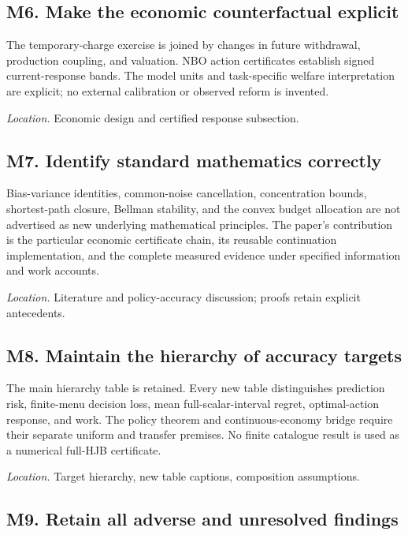 \documentclass[ecta,nameyear,draft]{econsocart}
\theoremstyle{definition}
\theoremstyle{remark}
\begin{document}
\subsection*{M6. Make the economic counterfactual explicit}

The temporary-charge exercise is joined by changes in future withdrawal, production coupling, and valuation. NBO action certificates establish signed current-response bands. The model units and task-specific welfare interpretation are explicit; no external calibration or observed reform is invented.


\par\smallskip\noindent\emph{Location.} Economic design and certified response subsection.

\subsection*{M7. Identify standard mathematics correctly}

Bias-variance identities, common-noise cancellation, concentration bounds, shortest-path closure, Bellman stability, and the convex budget allocation are not advertised as new underlying mathematical principles. The paper's contribution is the particular economic certificate chain, its reusable continuation implementation, and the complete measured evidence under specified information and work accounts.


\par\smallskip\noindent\emph{Location.} Literature and policy-accuracy discussion; proofs retain explicit antecedents.

\subsection*{M8. Maintain the hierarchy of accuracy targets}

The main hierarchy table is retained. Every new table distinguishes prediction risk, finite-menu decision loss, mean full-scalar-interval regret, optimal-action response, and work. The policy theorem and continuous-economy bridge require their separate uniform and transfer premises. No finite catalogue result is used as a numerical full-HJB certificate.


\par\smallskip\noindent\emph{Location.} Target hierarchy, new table captions, composition assumptions.

\subsection*{M9. Retain all adverse and unresolved findings}
\end{document}
